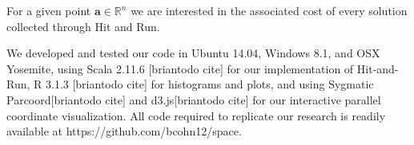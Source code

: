 For a given point $\textbf{a} \in \mathbb{R}^n$ we are interested in the associated cost of every solution collected through Hit and Run.

We developed and tested our code in  Ubuntu 14.04, Windows 8.1, and OSX Yosemite, using Scala 2.11.6 [briantodo cite] for our implementation of Hit-and-Run, R 3.1.3 [briantodo cite] for histograms and plots, and using Sygmatic Parcoord[briantodo cite] and d3.js[briantodo cite] for our interactive parallel coordinate visualization. All code required to replicate our research is readily available at https://github.com/bcohn12/space.